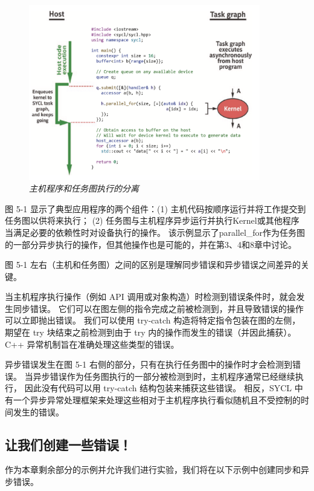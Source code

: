 \begin{figure}[H]
	\centering
	\includegraphics[width=0.9\textwidth]{figs/F5.1.png}
	\caption{\textit{主机程序和任务图执行的分离}}
\end{figure}

图 5-1 显示了典型应用程序的两个组件：(1) 主机代码按顺序运行并将工作提交到任务图以供将来执行；
(2) 任务图与主机程序异步运行并执行Kernel或其他程序 当满足必要的依赖性时对设备执行的操作。 
该示例显示了parallel\_for作为任务图的一部分异步执行的操作，但其他操作也是可能的，并在第3、4和8章中讨论。

图 5-1 左右（主机和任务图）之间的区别是理解同步错误和异步错误之间差异的关键。

当主机程序执行操作（例如 API 调用或对象构造）时检测到错误条件时，就会发生同步错误。 
它们可以在图左侧的指令完成之前被检测到，并且导致错误的操作可以立即抛出错误。 
我们可以使用 try-catch 构造将特定指令包装在图的左侧，
期望在 try 块结束之前检测到由于 try 内的操作而发生的错误（并因此捕获）。 
C++ 异常机制旨在准确处理这些类型的错误。

异步错误发生在图 5-1 右侧的部分，只有在执行任务图中的操作时才会检测到错误。 
当异步错误作为任务图执行的一部分被检测到时，主机程序通常已经继续执行，
因此没有代码可以用 try-catch 结构包装来捕获这些错误。 
相反，SYCL 中有一个异步异常处理框架来处理这些相对于主机程序执行看似随机且不受控制的时间发生的错误。

\subsection{让我们创建一些错误！}
作为本章剩余部分的示例并允许我们进行实验，我们将在以下示例中创建同步和异步错误。

